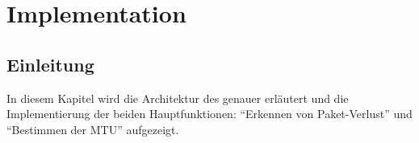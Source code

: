 \chapter{Implementation}
\label{chap:Implementation}

\section{Einleitung}
In diesem Kapitel wird die Architektur des \tool{} genauer erläutert und die Implementierung der beiden Hauptfunktionen: \enquote{Erkennen von Paket-Verlust} und \enquote{Bestimmen der \acs{MTU}} aufgezeigt.


\clearpage


\clearpage

 
\clearpage

 